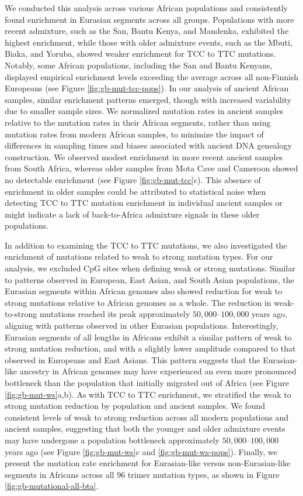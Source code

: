 We conducted this analysis across various African populations and consistently found enrichment in Eurasian segments across all groups. Populations with more recent admixture, such as the San, Bantu Kenya, and Mandenka, exhibited the highest enrichment, while those with older admixture events, such as the Mbuti, Biaka, and Yoruba, showed weaker enrichment for TCC to TTC mutations. Notably, some African populations, including the San and Bantu Kenyans, displayed empirical enrichment levels exceeding the average across all non-Finnish Europeans (see Figure \ref{fig:gb-mut-tcc-pops}). In our analysis of ancient African samples, similar enrichment patterns emerged, though with increased variability due to smaller sample sizes. We normalized mutation rates in ancient samples relative to the mutation rates in their African segments, rather than using mutation rates from modern African samples, to minimize the impact of differences in sampling times and biases associated with ancient DNA genealogy construction. We observed modest enrichment in more recent ancient samples from South Africa, whereas older samples from Mota Cave and Cameroon showed no detectable enrichment (see Figure \ref{fig:gb-mut-tcc}c). This absence of enrichment in older samples could be attributed to statistical noise when detecting TCC to TTC mutation enrichment in individual ancient samples or might indicate a lack of back-to-Africa admixture signals in these older populations.

In addition to examining the TCC to TTC mutations, we also investigated the enrichment of mutations related to weak to strong mutation types. For our analysis, we excluded CpG sites when defining weak or strong mutations. Similar to patterns observed in European, East Asian, and South Asian populations, the Eurasian segments within African genomes also showed reduction for weak to strong mutations relative to African genomes as a whole. The reduction in weak-to-strong mutations reached its peak approximately $50{,}000$–$100{,}000$ years ago, aligning with patterns observed in other Eurasian populations. Interestingly, Eurasian segments of all lengths in Africans exhibit a similar pattern of weak to strong mutation reduction, and with a slightly lower amplitude compared to that observed in Europeans and East Asians. This pattern suggests that the Eurasian-like ancestry in African genomes may have experienced an even more pronounced bottleneck than the population that initially migrated out of Africa (see Figure \ref{fig:gb-mut-ws}a,b). As with TCC to TTC enrichment, we stratified the weak to strong mutation reduction by population and ancient samples. We found consistent levels of weak to strong reduction across all modern populations and ancient samples, suggesting that both the younger and older admixture events may have undergone a population bottleneck approximately $50{,}000$–$100{,}000$ years ago (see Figure \ref{fig:gb-mut-ws}c and \ref{fig:gb-mut-ws-pops}). Finally, we present the mutation rate enrichment for Eurasian-like versus non-Eurasian-like segments in Africans across all 96 trimer mutation types, as shown in Figure \ref{fig:gb-mutational-all-bta}.

